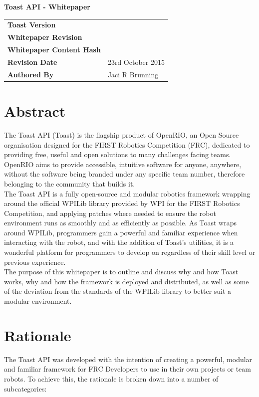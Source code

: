 \documentclass[a4paper,12pt]{article}
\newcommand{\auth}{Jaci R Brunning}
\newcommand{\editdate}{23rd October 2015}
\begin{document}
\huge \textbf{Toast API - Whitepaper}

\normalsize
\begin{tabular}{p{5.5cm}p{12.5cm}}
	\textbf{Toast Version} &
		\toast\\
	\textbf{Whitepaper Revision} &
		\revision\\
	\textbf{Whitepaper Content Hash} &
		\checksum\\
	\textbf{Revision Date} &
		\editdate\\
	\textbf{Authored By} &
		\auth\\
\end{tabular}

\tableofcontents

\newpage

\section{Abstract}
The Toast API (Toast) is the flagship product of OpenRIO, an Open Source organisation designed for the FIRST Robotics Competition (FRC), dedicated to providing free, useful and open solutions to many challenges facing teams. OpenRIO aims to provide accessible, intuitive software for anyone, anywhere, without the software being branded under any specific team number, therefore belonging to the community that builds it.\\

The Toast API is a fully open-source and modular robotics framework wrapping around the official WPILib library provided by WPI for the FIRST Robotics Competition, and applying patches where needed to ensure the robot environment runs as smoothly and as efficiently as possible. As Toast wraps around WPILib, programmers gain a powerful and familiar experience when interacting with the robot, and with the addition of Toast's utilities, it is a wonderful platform for programmers to develop on regardless of their skill level or previous experience.\\

The purpose of this whitepaper is to outline and discuss why and how Toast works, why and how the framework is deployed and distributed, as well as some of the deviation from the standards of the WPILib library to better suit a modular environment. 

\newpage

\section{Rationale}
The Toast API was developed with the intention of creating a powerful, modular and familiar framework for FRC Developers to use in their own projects or team robots. To achieve this, the rationale is broken down into a number of subcategories:
\end{document}
